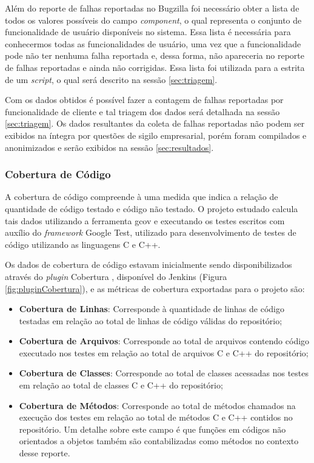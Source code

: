 \documentclass[11.5pt]{article}
\begin{document}
Além do reporte de falhas reportadas no Bugzilla foi necessário obter a lista de todos os valores
possíveis do campo \textit{component}, o qual representa o conjunto de funcionalidade de usuário
disponíveis no sistema.
Essa lista é necessária para conhecermos todas as funcionalidades de usuário, uma vez que a
funcionalidade pode não ter nenhuma falha reportada e, dessa forma, não apareceria no reporte de
falhas reportadas e ainda não corrigidas.
Essa lista foi utilizada para a estrita de um \textit{script}, o qual será descrito na sessão
\ref{sec:triagem}.

Com os dados obtidos é possível fazer a contagem de falhas reportadas por funcionalidade de cliente
e tal triagem dos dados será detalhada na sessão \ref{sec:triagem}.
Os dados resultantes da coleta de falhas reportadas não podem ser exibidos na íntegra por questões
de sigilo empresarial, porém foram compilados e anonimizados e serão exibidos na sessão
\ref{sec:resultados}.

\subsubsection{Cobertura de Código} \label{sec:cobertura}

A cobertura de código compreende à uma medida que indica a relação de quantidade de código testado
e código não testado.
O projeto estudado calcula tais dados utilizando a ferramenta gcov e executando os testes escritos
com auxílio do \textit{framework} Google Test, utilizado para desenvolvimento de testes de código
utilizando as linguagens C e C++.

Os dados de cobertura de código estavam inicialmente sendo disponibilizados através do
\textit{plugin} Cobertura \cite{jenkinsCobertura}, disponível do Jenkins
(Figura \ref{fig:pluginCobertura}), e as métricas de cobertura exportadas para o projeto são:
\begin{itemize}
    \item \textbf{Cobertura de Linhas}: Corresponde à quantidade de linhas de código testadas em
          relação ao total de linhas de código válidas do repositório;

    \item \textbf{Cobertura de Arquivos}: Corresponde ao total de arquivos contendo código executado
          nos testes em relação ao total de arquivos C e C++ do repositório;

    \item \textbf{Cobertura de Classes}: Corresponde ao total de classes acessadas nos testes em
          relação ao total de classes C e C++ do repositório;

    \item \textbf{Cobertura de Métodos}: Corresponde ao total de métodos chamados na execução dos
          testes em relação ao total de métodos C e C++ contidos no repositório.
          Um detalhe sobre este campo é que funções em códigos não orientados a objetos também são
          contabilizadas como métodos no contexto desse reporte.
\end{itemize}
\end{document}
